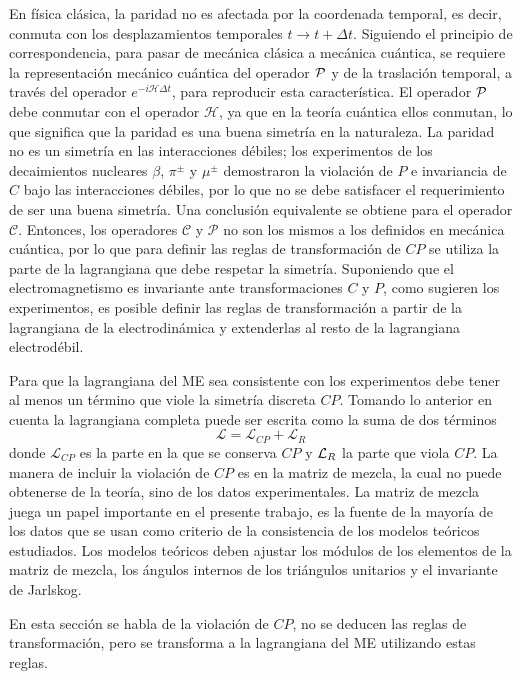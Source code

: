 En f\'isica cl\'asica, la paridad no es afectada por la coordenada temporal, es 
decir, conmuta con los desplazamientos temporales $t\rightarrow t+\Delta 
t$. Siguiendo el principio de correspondencia, para pasar de mec\'anica 
cl\'asica a mec\'anica cu\'antica, se requiere la representaci\'on mec\'anico 
cu\'antica del operador $\cal P$ y de la traslaci\'on temporal, a trav\'es del 
operador  $e^{-i\mathcal{H}\Delta t}$, para reproducir esta caracter\'istica. El
operador $\cal P$ debe conmutar con el operador $\mathcal{H}$, ya que en la 
teor\'ia cu\'antica ellos conmutan, lo que significa que la paridad es una buena
simetr\'ia en la naturaleza. La paridad no es un simetr\'ia en las interacciones
d\'ebiles; los experimentos de los decaimientos nucleares $\beta$, $\pi^{\pm}$ y
$\mu^{\pm}$ demostraron la violaci\'on  de $P$ e invariancia de $C$ bajo las 
interacciones d\'ebiles, por lo que no se debe satisfacer el requerimiento de 
ser una buena simetr\'ia. Una conclusi\'on equivalente se obtiene para el 
operador $\mathcal{C}$. Entonces, los operadores $\mathcal{C}$ y $\mathcal{P}$ 
no son los mismos a los definidos en mec\'anica cu\'antica, por lo que para 
definir las reglas de transformaci\'on de $CP$ se utiliza la parte de la 
lagrangiana que debe respetar la simetr\'ia. Suponiendo que el electromagnetismo
es invariante ante transformaciones $C$ y $P$, como sugieren los experimentos, 
es posible definir las reglas de transformaci\'on a partir de la lagrangiana de 
la electrodin\'amica y extenderlas al resto de la lagrangiana electrod\'ebil. 


Para que la lagrangiana del ME sea consistente con los experimentos debe tener 
al menos un t\'ermino que viole la simetr\'ia discreta $CP$. Tomando lo anterior
en cuenta la lagrangiana completa puede ser escrita como la suma de dos 
t\'erminos
$$
\mathcal{L}=\mathcal{L}_{CP}+\mathcal{L}_R
$$
donde $\mathcal{L}_{CP}$ es la parte en la que se conserva $CP$ y ${\cal L}_R$
la parte que viola $CP$. La manera de incluir la violaci\'on de $CP$ es en la
 matriz de mezcla, la cual no puede obtenerse de la teor\'ia, sino de los datos
experimentales. La matriz de mezcla juega un papel importante en el presente 
trabajo, es la fuente de la mayor\'ia de los datos que se usan como criterio de
la consistencia de los modelos te\'oricos estudiados. Los modelos te\'oricos 
deben ajustar los m\'odulos de los elementos de la matriz de mezcla, los 
\'angulos internos de los tri\'angulos unitarios y el invariante de Jarlskog. 

En esta secci\'on se habla de la violaci\'on de $CP$, no se deducen las reglas
de transformaci\'on, pero se transforma a la lagrangiana del ME utilizando estas
reglas. 


